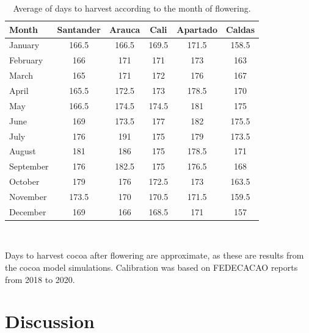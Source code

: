 \documentclass[gene,journal,article,submit,moreauthors,pdftex]{Definitions/mdpi}
\begin{document}
\begin{table}[h!]	
	\caption {\footnotesize {Average of days to harvest according to the month of flowering.}}
	\label{tab:harvest} 
	\centering
	\begin{small}
		{\def\arraystretch{2}\tabcolsep=10pt
		\begin{tabular}{l c c c c c }
			\hline
			{\bf Month }&{\bf Santander }&{\bf Arauca}&{\bf Cali}&{\bf Apartado}&{\bf Caldas}\\
			\hline
			January    & 166.5 & 166.5 & 169.5& 171.5 & 158.5 \\
			February   & 166 & 171 & 171 & 173 & 163  \\
			March      & 165 & 171 & 172 & 176 & 167  \\
			April      & 165.5 & 172.5 & 173& 178.5 & 170   \\
			May       & 166.5 & 174.5 & 174.5&  181& 175   \\
			June      & 169 & 173.5 & 177&  182& 175.5   \\
			July      & 176 & 191 & 175& 179 & 173.5  \\
			August    & 181 & 186 & 175& 178.5 & 171   \\
			September   & 176 & 182.5 & 175& 176.5 & 168   \\
			October    & 179 & 176 & 172.5& 173 & 163.5   \\
			November   & 173.5 & 170 & 170.5&171.5 & 159.5   \\
			December   & 169 & 166 & 168.5& 171 & 157  \\
			\hline
		\end{tabular} \\
	}
		{\footnotesize Days to harvest cocoa after flowering are approximate, as these are results from the cocoa model simulations. Calibration was based on FEDECACAO reports from 2018 to 2020. } 
	\end{small}
\end{table}

\section{Discussion}
\end{document}
